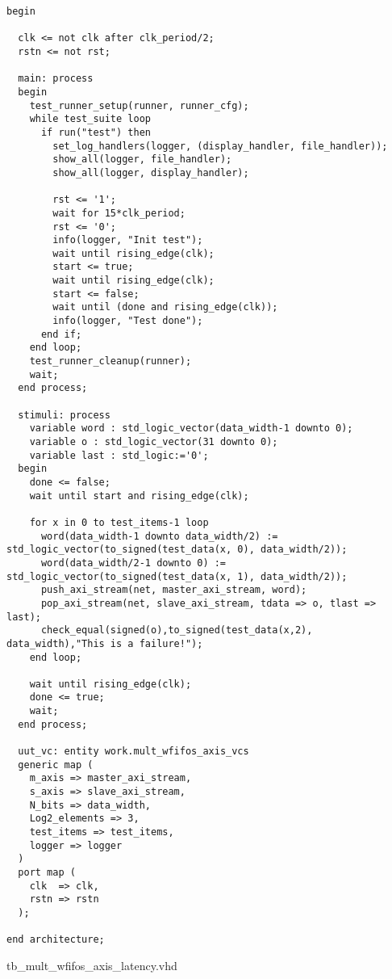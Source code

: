 \begin{code}
\begin{verbatim}
begin

  clk <= not clk after clk_period/2;
  rstn <= not rst;

  main: process
  begin
    test_runner_setup(runner, runner_cfg);
    while test_suite loop
      if run("test") then
        set_log_handlers(logger, (display_handler, file_handler));
        show_all(logger, file_handler);
        show_all(logger, display_handler);

        rst <= '1';
        wait for 15*clk_period;
        rst <= '0';
        info(logger, "Init test");
        wait until rising_edge(clk);
        start <= true;
        wait until rising_edge(clk);
        start <= false;
        wait until (done and rising_edge(clk));
        info(logger, "Test done");
      end if;
    end loop;
    test_runner_cleanup(runner);
    wait;
  end process;

  stimuli: process
    variable word : std_logic_vector(data_width-1 downto 0);
    variable o : std_logic_vector(31 downto 0);
    variable last : std_logic:='0';
  begin
    done <= false;
    wait until start and rising_edge(clk);

    for x in 0 to test_items-1 loop
      word(data_width-1 downto data_width/2) := std_logic_vector(to_signed(test_data(x, 0), data_width/2));
      word(data_width/2-1 downto 0) := std_logic_vector(to_signed(test_data(x, 1), data_width/2));
      push_axi_stream(net, master_axi_stream, word);
      pop_axi_stream(net, slave_axi_stream, tdata => o, tlast => last);
      check_equal(signed(o),to_signed(test_data(x,2), data_width),"This is a failure!");
    end loop;

    wait until rising_edge(clk);
    done <= true;
    wait;
  end process;

  uut_vc: entity work.mult_wfifos_axis_vcs
  generic map (
    m_axis => master_axi_stream,
    s_axis => slave_axi_stream,
    N_bits => data_width,
    Log2_elements => 3,
    test_items => test_items,
    logger => logger
  )
  port map (
    clk  => clk,
    rstn => rstn
  );

end architecture;
\end{verbatim}
\caption{tb\_mult\_wfifos\_axis\_latency.vhd}
\label{ap-cod:21}
\end{code}

